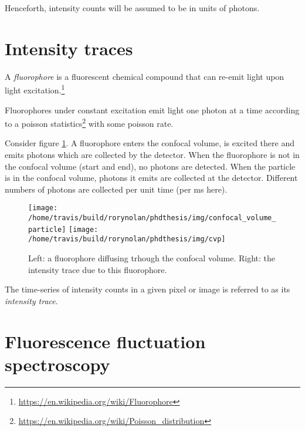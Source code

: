 \documentclass[12pt,]{book}
\let\rmarkdownfootnote\footnote%
\def\footnote{\protect\rmarkdownfootnote}
\theoremstyle{definition}
\theoremstyle{definition}
\theoremstyle{definition}
\theoremstyle{remark}
\let\BeginKnitrBlock\begin \let\EndKnitrBlock\end
\begin{document}
\BeginKnitrBlock{remark}
\iffalse{} {Remark. } \fi{}Henceforth, intensity counts will be assumed
to be in units of photons.
\EndKnitrBlock{remark}

\section{Intensity traces}\label{intensity-traces}

\BeginKnitrBlock{definition}
\protect\hypertarget{def:unnamed-chunk-3}{}{\label{def:unnamed-chunk-3} }A
\emph{fluorophore} is a fluorescent chemical compound that can re-emit
light upon light excitation.\footnote{\url{https://en.wikipedia.org/wiki/Fluorophore}}
\EndKnitrBlock{definition}

Fluorophores under constant excitation emit light one photon at a time
according to a poisson statistics\footnote{\url{https://en.wikipedia.org/wiki/Poisson_distribution}}
with some poisson rate.

Consider figure \ref{fig:confocal-volume-particle}. A fluorophore enters
the confocal volume, is excited there and emits photons which are
collected by the detector. When the fluorophore is not in the confocal
volume (start and end), no photons are detected. When the particle is in
the confocal volume, photons it emits are collected at the detector.
Different numbers of photons are collected per unit time (per ms here).





\begin{figure}

\texttt{[image: /home/travis/build/rorynolan/phdthesis/img/confocal\_volume\_particle]} \texttt{[image: /home/travis/build/rorynolan/phdthesis/img/cvp]} \hfill{}

\caption{Left: a fluorophore diffusing
trhough the confocal volume. Right: the intensity trace due to this
fluorophore.}\label{fig:confocal-volume-particle}
\end{figure}

\BeginKnitrBlock{definition}
\protect\hypertarget{def:unnamed-chunk-4}{}{\label{def:unnamed-chunk-4} }The
time-series of intensity counts in a given pixel or image is referred to
as its \emph{intensity trace}.
\EndKnitrBlock{definition}

\section{Fluorescence fluctuation
spectroscopy}\label{fluorescence-fluctuation-spectroscopy}
\end{document}
